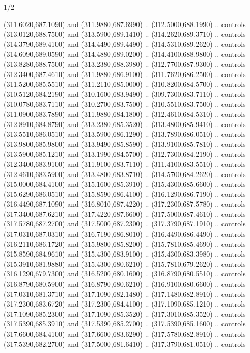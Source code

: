 \begin{flagdescription}{1/2}
\begin{scope}[xshift=0.5\flaglength]
\begin{scope}[scale=0.00745\flagwidth,xshift=-12.1mm,yshift=41.7mm]
\begin{scope}[y=0.80pt, x=0.80pt, yscale=-1, xscale=1, inner sep=0pt, outer sep=0pt]
\begin{scope}[cm={{1.33333,0.0,0.0,-1.33333,(0.0,114.66667)}}]
\begin{scope}[scale=0.100]
  (311.6020,687.1090) and (311.9880,687.6990) .. (312.5000,688.1990) .. controls
  (313.0120,688.7500) and (313.5900,689.1410) .. (314.2620,689.3710) .. controls
  (314.3790,689.4100) and (314.4490,689.4490) .. (314.5310,689.2620) .. controls
  (314.6090,689.0590) and (314.4880,689.0200) .. (314.4100,688.9800) .. controls
  (313.8280,688.7500) and (313.2380,688.3980) .. (312.7700,687.9300) .. controls
  (312.3400,687.4610) and (311.9880,686.9100) .. (311.7620,686.2500) .. controls
  (311.5200,685.5510) and (311.2110,685.0000) .. (310.8200,684.5700) .. controls
  (310.5120,684.2190) and (310.1600,683.9490) .. (309.7300,683.7110) .. controls
  (310.0780,683.7110) and (310.2700,683.7500) .. (310.5510,683.7500) .. controls
  (311.0900,683.7890) and (311.9880,684.1800) .. (312.4610,684.5310) .. controls
  (312.8910,684.8790) and (313.2380,685.3520) .. (313.4800,685.9410) .. controls
  (313.5510,686.0510) and (313.5900,686.1290) .. (313.7890,686.0510) .. controls
  (313.9800,685.9800) and (313.9490,685.8590) .. (313.9100,685.7810) .. controls
  (313.5900,685.1210) and (313.1990,684.5700) .. (312.7300,684.2190) .. controls
  (312.3400,683.9100) and (311.9100,683.7110) .. (311.4100,683.5510) .. controls
  (312.4610,683.5900) and (313.4800,683.8710) .. (314.5700,684.2620) .. controls
  (315.0000,684.4100) and (315.1600,685.3910) .. (315.4300,685.6600) .. controls
  (315.6290,686.0510) and (315.8590,686.4100) .. (316.1290,686.7190) .. controls
  (316.4490,687.1090) and (316.8010,687.4220) .. (317.2300,687.5780) .. controls
  (317.3400,687.6210) and (317.4220,687.6600) .. (317.5000,687.4610) .. controls
  (317.5780,687.2700) and (317.5000,687.2300) .. (317.3790,687.1910) .. controls
  (317.0310,687.0310) and (316.7190,686.8010) .. (316.4490,686.4490) .. controls
  (316.2110,686.1720) and (315.9800,685.8200) .. (315.7810,685.4690) .. controls
  (315.8590,684.9610) and (315.4300,683.9100) .. (315.4300,683.3980) .. controls
  (315.3910,681.9880) and (315.4300,680.6210) .. (315.7810,679.2620) .. controls
  (316.1290,679.7300) and (316.5200,680.1600) .. (316.8790,680.5510) .. controls
  (316.8790,680.5900) and (316.8790,680.6210) .. (316.9100,680.6600) .. controls
  (317.0310,681.3710) and (317.1090,682.1480) .. (317.1480,682.8910) .. controls
  (317.2300,683.6720) and (317.2300,684.4100) .. (317.1090,685.1210) .. controls
  (317.1090,685.2300) and (317.1090,685.3520) .. (317.3010,685.3520) .. controls
  (317.5390,685.3910) and (317.5390,685.2700) .. (317.5390,685.1600) .. controls
  (317.6600,684.4100) and (317.6600,683.6290) .. (317.5780,682.8910) .. controls
  (317.5390,682.2700) and (317.5000,681.6410) .. (317.3790,681.0510) .. controls

\end{scope}
\end{scope}
\end{scope}
\end{scope}
\end{scope}
\end{flagdescription}
